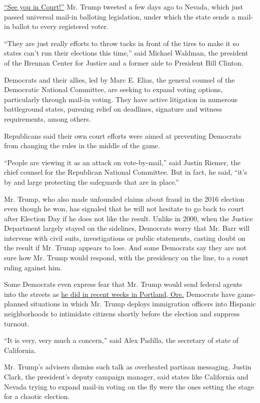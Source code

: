 \href{https://twitter.com/realDonaldTrump/status/1290250416278532096}{``See
you in Court!''} Mr. Trump tweeted a few days ago to Nevada, which just
passed universal mail-in balloting legislation, under which the state
sends a mail-in ballot to every registered voter.

``They are just really efforts to throw tacks in front of the tires to
make it so states can't run their elections this time,'' said Michael
Waldman, the president of the Brennan Center for Justice and a former
aide to President Bill Clinton.

Democrats and their allies, led by Marc E. Elias, the general counsel of
the Democratic National Committee, are seeking to expand voting options,
particularly through mail-in voting. They have active litigation in
numerous battleground states, pursuing relief on deadlines, signature
and witness requirements, among others.

Republicans said their own court efforts were aimed at preventing
Democrats from changing the rules in the middle of the game.

``People are viewing it as an attack on vote-by-mail,'' said Justin
Riemer, the chief counsel for the Republican National Committee. But in
fact, he said, ``it's by and large protecting the safeguards that are in
place.''

Mr. Trump, who also made unfounded claims about fraud in the 2016
election even though he won, has signaled that he will not hesitate to
go back to court after Election Day if he does not like the result.
Unlike in 2000, when the Justice Department largely stayed on the
sidelines, Democrats worry that Mr. Barr will intervene with civil
suits, investigations or public statements, casting doubt on the result
if Mr. Trump appears to lose. And some Democrats say they are not sure
how Mr. Trump would respond, with the presidency on the line, to a court
ruling against him.

Some Democrats even express fear that Mr. Trump would send federal
agents into the streets as
\href{https://www.nytimes.com/2020/07/21/us/politics/trump-portland-federal-agents.html}{he
did in recent weeks in Portland, Ore.} Democrats have game-planned
situations in which Mr. Trump deploys immigration officers into Hispanic
neighborhoods to intimidate citizens shortly before the election and
suppress turnout.

``It is very, very much a concern,'' said Alex Padilla, the secretary of
state of California.

Mr. Trump's advisers dismiss such talk as overheated partisan messaging.
Justin Clark, the president's deputy campaign manager, said states like
California and Nevada trying to expand mail-in voting on the fly were
the ones setting the stage for a chaotic election.

